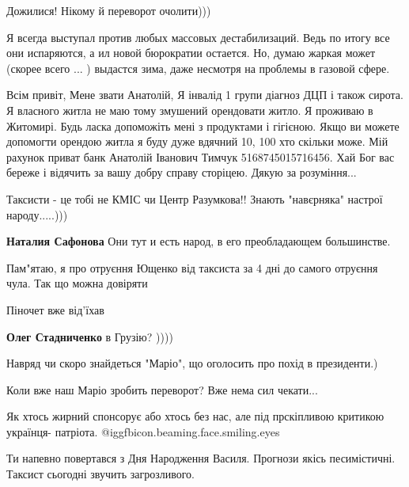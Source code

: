 \begin{itemize}
Дожилися! Нікому й переворот очолити)))


Я всегда выступал против любых массовых дестабилизаций. Ведь по итогу все они
испаряются, а ил новой бюрократии остается.  Но, думаю жаркая может (скорее
всего ... ) выдастся зима, даже несмотря на проблемы в газовой сфере.


Всім привіт, Мене звати Анатолій, Я інвалід 1 групи діагноз ДЦП і також сирота.
Я власного житла не маю тому змушений орендовати житло. Я проживаю в Житомирі.
Будь ласка допоможіть мені з продуктами і гігієною. Якщо ви можете допомогти
орендою житла я буду дуже вдячний 10, 100 хто скільки може. Мій рахунок приват
банк Анатолій Іванович Тимчук 5168745015716456. Хай Бог вас береже і відячить
за вашу добру справу сторіцею. Дякую за розуміння...


Таксисти - це тобі не КМІС чи Центр Разумкова!! Знають "навєрняка" настрої
народу.....)))

\begin{itemize} %
\textbf{Наталия Сафонова} Они тут и есть народ, в его преобладающем большинстве.
\end{itemize} %


Пам"ятаю, я про отруєння Ющенко від таксиста за 4 дні до самого отруєння чула. Так що можна довіряти

Піночет вже від’їхав

\begin{itemize} %
\textbf{Олег Стадниченко} в Грузію? ))))
\end{itemize} %

Навряд чи скоро знайдеться "Маріо", що оголосить про похід в президенти.)

Коли вже наш Маріо зробить переворот? Вже нема сил чекати...

Як хтось жирний спонсорує або хтось без нас, але під прскіпливою критикою українця- патріота. @igg{fbicon.beaming.face.smiling.eyes} 

Ти напевно повертався з Дня Народження Василя. Прогнози якісь песимістичні. Таксист сьогодні звучить загрозливого.


\end{itemize}
